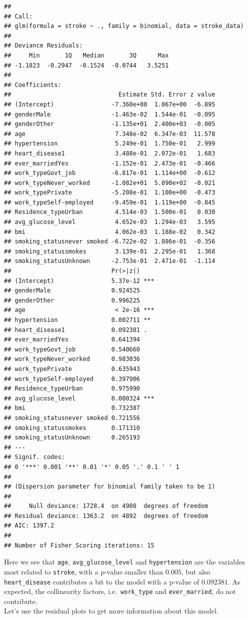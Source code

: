 \documentclass[
]{article}
\begin{document}
\begin{verbatim}
## 
## Call:
## glm(formula = stroke ~ ., family = binomial, data = stroke_data)
## 
## Deviance Residuals: 
##     Min       1Q   Median       3Q      Max  
## -1.1823  -0.2947  -0.1524  -0.0744   3.5251  
## 
## Coefficients:
##                              Estimate Std. Error z value
## (Intercept)                -7.360e+00  1.067e+00  -6.895
## genderMale                 -1.463e-02  1.544e-01  -0.095
## genderOther                -1.135e+01  2.400e+03  -0.005
## age                         7.348e-02  6.347e-03  11.578
## hypertension                5.249e-01  1.750e-01   2.999
## heart_disease1              3.488e-01  2.072e-01   1.683
## ever_marriedYes            -1.152e-01  2.473e-01  -0.466
## work_typeGovt_job          -6.817e-01  1.114e+00  -0.612
## work_typeNever_worked      -1.082e+01  5.090e+02  -0.021
## work_typePrivate           -5.208e-01  1.100e+00  -0.473
## work_typeSelf-employed     -9.459e-01  1.119e+00  -0.845
## Residence_typeUrban         4.514e-03  1.500e-01   0.030
## avg_glucose_level           4.652e-03  1.294e-03   3.595
## bmi                         4.062e-03  1.188e-02   0.342
## smoking_statusnever smoked -6.722e-02  1.886e-01  -0.356
## smoking_statussmokes        3.139e-01  2.295e-01   1.368
## smoking_statusUnknown      -2.753e-01  2.471e-01  -1.114
##                            Pr(>|z|)    
## (Intercept)                5.37e-12 ***
## genderMale                 0.924525    
## genderOther                0.996225    
## age                         < 2e-16 ***
## hypertension               0.002711 ** 
## heart_disease1             0.092381 .  
## ever_marriedYes            0.641394    
## work_typeGovt_job          0.540660    
## work_typeNever_worked      0.983036    
## work_typePrivate           0.635943    
## work_typeSelf-employed     0.397906    
## Residence_typeUrban        0.975990    
## avg_glucose_level          0.000324 ***
## bmi                        0.732387    
## smoking_statusnever smoked 0.721556    
## smoking_statussmokes       0.171310    
## smoking_statusUnknown      0.265193    
## ---
## Signif. codes:  
## 0 '***' 0.001 '**' 0.01 '*' 0.05 '.' 0.1 ' ' 1
## 
## (Dispersion parameter for binomial family taken to be 1)
## 
##     Null deviance: 1728.4  on 4908  degrees of freedom
## Residual deviance: 1363.2  on 4892  degrees of freedom
## AIC: 1397.2
## 
## Number of Fisher Scoring iterations: 15
\end{verbatim}

Here we see that \texttt{age}, \texttt{avg\_glucose\_level} and
\texttt{hypertension} are the variables most related to \texttt{stroke},
with a p-value smaller than \(0.005\), but also \texttt{heart\_disease}
contributes a bit to the model with a p-value of \(0.092381\). As
expected, the collinearity factors, i.e.~\texttt{work\_type} and \texttt{ever\_married}, do not
contribute.\\
Let's use the residual plots to get more information about this model.
\end{document}
